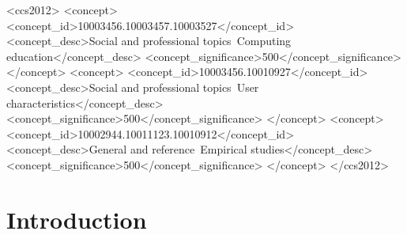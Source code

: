 \documentclass[manuscript,review]{acmart}
\begin{document}
\begin{CCSXML}
<ccs2012>
<concept>
<concept_id>10003456.10003457.10003527</concept_id>
<concept_desc>Social and professional topics~Computing education</concept_desc>
<concept_significance>500</concept_significance>
</concept>
<concept>
<concept_id>10003456.10010927</concept_id>
<concept_desc>Social and professional topics~User characteristics</concept_desc>
<concept_significance>500</concept_significance>
</concept>
<concept>
<concept_id>10002944.10011123.10010912</concept_id>
<concept_desc>General and reference~Empirical studies</concept_desc>
<concept_significance>500</concept_significance>
</concept>
</ccs2012>
\end{CCSXML}




\maketitle

\section{Introduction}

\end{document}
